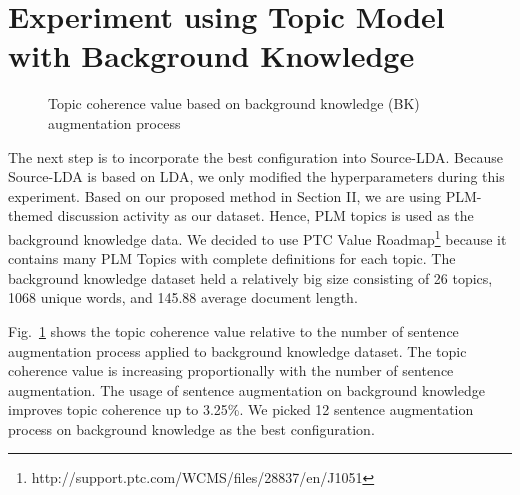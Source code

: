 \documentclass[senior]{IPSstyle}
\begin{document}
\section{Experiment using Topic Model with Background Knowledge}

\begin{figure}[h]
	\centering
	\caption{Topic coherence value based on background knowledge (BK) augmentation process}
\label{fig_tme2}
\end{figure}

The next step is to incorporate the best configuration into Source-LDA. Because Source-LDA is based on LDA, we only modified the hyperparameters during this experiment. Based on our proposed method in Section II, we are using PLM-themed discussion activity as our dataset. Hence, PLM topics is used as the background knowledge data. We decided to use PTC Value Roadmap\footnote{http://support.ptc.com/WCMS/files/28837/en/J1051} because it contains many PLM Topics with complete definitions for each topic. The background knowledge dataset held a relatively big size consisting of 26 topics, 1068 unique words, and 145.88 average document length.

Fig.~\ref{fig_tme2} shows the topic coherence value relative to the number of sentence augmentation process applied to background knowledge dataset. The topic coherence value is increasing proportionally with the number of sentence augmentation. The usage of sentence augmentation on background knowledge improves topic coherence up to 3.25\%. We picked 12 sentence augmentation process on background knowledge as the best configuration.
\end{document}
